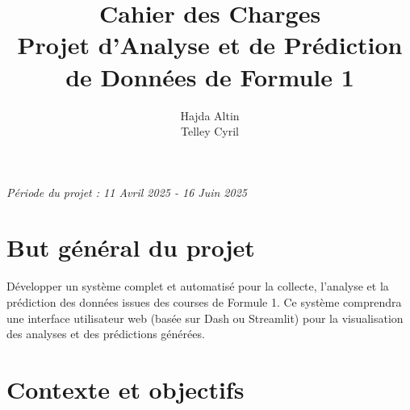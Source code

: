 \documentclass[11pt, a4paper]{article}
\title{
    \vspace{2cm} %
    \textbf{Cahier des Charges} \\
    \vspace{0.5cm}
    \Large Projet d'Analyse et de Prédiction de Données de Formule 1
    \vspace{1.5cm} %
}
\author{Hajda Altin \\ Telley Cyril}
\date{\currentReportDate} %
\newcommand{\startDate}{11 Avril 2025}
\newcommand{\endDate}{16 Juin 2025}
\begin{document}
\begin{titlepage}
    \maketitle
    \vfill %
    \begin{center}
        \textit{Période du projet : \startDate{} - \endDate}
    \end{center}
    \thispagestyle{empty} %
\end{titlepage}

\newpage %
\tableofcontents %
\thispagestyle{empty} %
\newpage

\setcounter{page}{1} %

\section{But général du projet}

Développer un système complet et automatisé pour la collecte, l'analyse et la prédiction des données issues des courses de Formule 1. Ce système comprendra une interface utilisateur web (basée sur Dash ou Streamlit) pour la visualisation des analyses et des prédictions générées.

\section{Contexte et objectifs}
\end{document}
